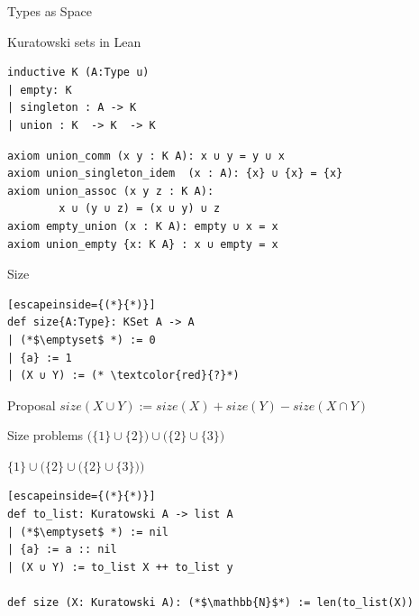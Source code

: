 \documentclass{beamer}
\begin{document}
\begin{frame}{Types as Space}
    \centering
\end{frame}
\begin{frame}[fragile]{Kuratowski sets in Lean}
    \begin{lstlisting}
inductive K (A:Type u) 
| empty: K 
| singleton : A -> K 
| union : K  -> K  -> K
    \end{lstlisting}
    \pause 
    \begin{lstlisting}
axiom union_comm (x y : K A): x ∪ y = y ∪ x
axiom union_singleton_idem  (x : A): {x} ∪ {x} = {x}
axiom union_assoc (x y z : K A): 
        x ∪ (y ∪ z) = (x ∪ y) ∪ z
axiom empty_union (x : K A): empty ∪ x = x
axiom union_empty {x: K A} : x ∪ empty = x
    \end{lstlisting}
    
\end{frame}

\begin{frame}[fragile]{Size}
    \begin{lstlisting}[escapeinside={(*}{*)}]        
def size{A:Type}: KSet A -> A
| (*$\emptyset$ *) := 0
| {a} := 1
| (X ∪ Y) := (* \textcolor{red}{?}*)
    \end{lstlisting}
\pause
    \begin{block}{Proposal}
        $size(X \cup Y) := size(X) + size (Y) - size(X \cap Y)$
    \end{block}
\end{frame}

\begin{frame}[fragile]{Size problems}
    $\bigl( \{1\} \cup \{2\} \bigr) \cup \bigl( \{2\} \cup \{3\} \bigr) $



    $ \{1\} \cup \bigl( \{2\} \cup \bigl( \{2\} \cup \{3\} \bigr) \bigr) $
\pause
\begin{lstlisting}[escapeinside={(*}{*)}]
def to_list: Kuratowski A -> list A
| (*$\emptyset$ *) := nil
| {a} := a :: nil
| (X ∪ Y) := to_list X ++ to_list y

def size (X: Kuratowski A): (*$\mathbb{N}$*) := len(to_list(X))
\end{lstlisting}
\end{frame}
\end{document}

